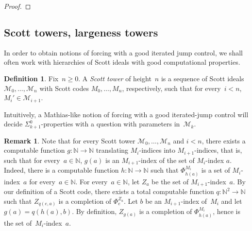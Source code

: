 \documentclass{article}
\def\NN{\mathbb{N}}
\def\A{\mathcal{A}}
\def\P{\mathcal{P}}
\def\M{\mathcal{M}}
\numberwithin{theorem}{section}
\theoremstyle{definition}
\newtheorem{definition}[theorem]{Definition}
\newtheorem{remark}[theorem]{Remark}
\begin{document}
\begin{proof}

\end{proof}

\subsection{Scott towers, largeness towers}

In order to obtain notions of forcing with a good iterated jump control, we shall often work with hierarchies of Scott ideals with good computational properties.

\begin{definition}
Fix~$n \geq 0$. A \emph{Scott tower} of height~$n$ is a sequence of Scott ideals $\M_0, \dots, \M_n$
with Scott codes $M_0, \dots, M_n$, respectively, such that for every~$i < n$, $M_i' \in \M_{i+1}$.
\end{definition}

Intuitively, a Mathias-like notion of forcing with a good iterated-jump control will decide $\Sigma^0_{k+1}$-properties with a question with parameters in~$\M_k$.


\begin{remark}\label{rem:index-translation}
Note that for every Scott tower $\M_0, \dots, \M_n$ and $i < n$, there exists a computable function $g : \NN \to \NN$
translating $M_i$-indices into $M_{i+1}$-indices, that is, such that for every~$a \in \NN$, $g(a)$ is an $M_{i+1}$-index of the set of $M_i$-index $a$. Indeed, there is a computable function $h : \NN \to \NN$ such that $\Phi^{M_i}_{h(a)}$ is a set of $M_i$-index~$a$ for every~$a \in \NN$. For every~$a \in \NN$, let $Z_a$ be the set of $M_{i+1}$-index~$a$. By our definition of a Scott code, there exists a total computable function $q : \NN^2 \to \NN$ such that $Z_{q(e, a)}$ is a completion of $\Phi_e^{Z_a}$. Let $b$ be an $M_{i+1}$-index of~$M_i$ and let $g(a) = q(h(a), b)$. By definition, $Z_{g(a)}$ is a completion of $\Phi^{M_i}_{h(a)}$, hence is the set of~$M_i$-index~$a$.
\end{remark}
\end{document}
